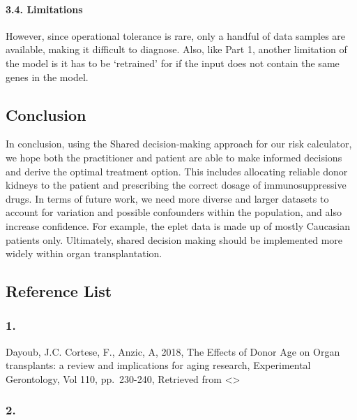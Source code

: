 \documentclass[a4paper,9pt,twocolumn,twoside,]{pinp}
\begin{document}
\hypertarget{limitations-2}{%
\paragraph{3.4. Limitations}\label{limitations-2}}

However, since operational tolerance is rare, only a handful of data
samples are available, making it difficult to diagnose. Also, like Part
1, another limitation of the model is it has to be `retrained' for if
the input does not contain the same genes in the model.

\hypertarget{conclusion}{%
\subsection{Conclusion}\label{conclusion}}

In conclusion, using the Shared decision-making approach for our risk
calculator, we hope both the practitioner and patient are able to make
informed decisions and derive the optimal treatment option. This
includes allocating reliable donor kidneys to the patient and
prescribing the correct dosage of immunosuppressive drugs. In terms of
future work, we need more diverse and larger datasets to account for
variation and possible confounders within the population, and also
increase confidence. For example, the eplet data is made up of mostly
Caucasian patients only. Ultimately, shared decision making should be
implemented more widely within organ transplantation.

\newpage

\hypertarget{reference-list}{%
\subsection{Reference List}\label{reference-list}}

\hypertarget{section}{%
\subsubsection{1.}\label{section}}

Dayoub, J.C. Cortese, F., Anzic, A, 2018, The Effects of Donor Age on
Organ transplants: a review and implications for aging research,
Experimental Gerontology, Vol 110, pp.~230-240, Retrieved from
\textless{}\textgreater{}

\hypertarget{section-1}{%
\subsubsection{2.}\label{section-1}}
\end{document}
